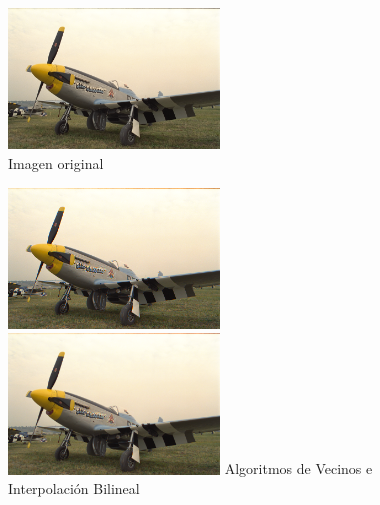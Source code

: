 {\begin{figure}[h]
\begin{center}
       \includegraphics[width=0.5\textwidth]{imagenes/img9.png}
        \caption{Imagen original}
\end{center}
\end{figure}

\begin{figure}[h]
       \includegraphics[width=0.5\textwidth]{imagenes/img9_demosicing_vecino.png}
           \hfill
        \includegraphics[width=0.5\textwidth]{imagenes/img9_demosicing_bilineal.png}
        Algoritmos de Vecinos e Interpolación Bilineal
\end{figure}


}
